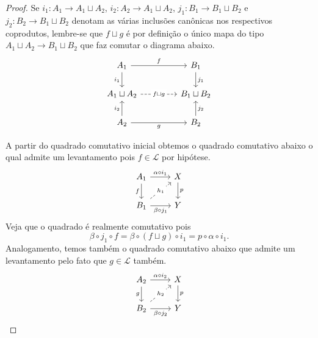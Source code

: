 \begin{proof}
  Se $i_{1}: A_{1} \to A_{1} \sqcup A_{2}$, $i_{2}: A_{2} \to A_{1} \sqcup A_{2}$, $j_{1}: B_{1} \to B_{1} \sqcup B_{2}$ e $j_{2}: B_{2} \to B_{1} \sqcup B_{2}$ denotam as várias inclusões canônicas nos respectivos coprodutos, lembre-se que $f \sqcup g$ é por definição o único mapa do tipo $A_{1} \sqcup A_{2} \to B_{1} \sqcup B_{2}$ que faz comutar o diagrama abaixo.
  \begin{displaymath}
    \begin{tikzcd}[column sep=1.5cm]
      A_{1}
      \arrow[r, "f"]
      \arrow[d, "i_{1}" swap]
      & B_{1}
      \arrow[d, "j_{1}"]
      \\ A_{1} \sqcup A_{2}
      \arrow[r, dashed, "f \sqcup g" description]
      & B_{1} \sqcup B_{2}
      \\ A_{2}
      \arrow[u, "i_{2}"]
      \arrow[r, "g" swap]
      & B_{2}
      \arrow[u, "j_{2}" swap]
    \end{tikzcd}
  \end{displaymath}

  A partir do quadrado comutativo inicial obtemos o quadrado comutativo abaixo o qual admite um levantamento pois $f \in \mathcal{L}$ por hipótese.
  \begin{displaymath}
    \begin{tikzcd}
      A_{1}
      \arrow[r, "\alpha \circ i_{1}"]
      \arrow[d, "f" swap]
      & X
      \arrow[d, "p"]
      \\ B_{1}
      \arrow[r, "\beta \circ j_{1}" swap]
      \arrow[ru, dashed, "h_{1}" description]
      & Y
    \end{tikzcd}
  \end{displaymath}
  Veja que o quadrado é realmente comutativo pois
  \begin{displaymath}
    \beta \circ j_{1} \circ f = \beta \circ (f \sqcup g) \circ i_{1} = p \circ \alpha \circ i_{1}.
  \end{displaymath}
  Analogamento, temos também o quadrado comutativo abaixo que admite um levantamento pelo fato que $g \in \mathcal{L}$ também.
  \begin{displaymath}
    \begin{tikzcd}
      A_{2}
      \arrow[r, "\alpha \circ i_{2}"]
      \arrow[d, "g" swap]
      & X
      \arrow[d, "p"]
      \\ B_{2}
      \arrow[r, "\beta \circ j_{2}" swap]
      \arrow[ru, dashed, "h_{2}" description]
      & Y
    \end{tikzcd}
  \end{displaymath}


\end{proof}
